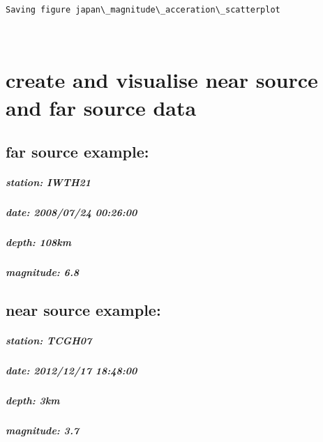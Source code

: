 \documentclass[11pt]{article}
\begin{document}
    \begin{Verbatim}[commandchars=\\\{\}]
Saving figure japan\_magnitude\_acceration\_scatterplot
    \end{Verbatim}

    \begin{center}
    \end{center}
    { \hspace*{\fill} \\}
    
    \hypertarget{create-and-visualise-near-source-and-far-source-data}{%
\section{create and visualise near source and far source
data}\label{create-and-visualise-near-source-and-far-source-data}}

\hypertarget{far-source-example}{%
\subsection{far source example:}\label{far-source-example}}

\hypertarget{station-iwth21}{%
\subparagraph{station: IWTH21}\label{station-iwth21}}

\hypertarget{date-20080724-002600}{%
\subparagraph{date: 2008/07/24 00:26:00}\label{date-20080724-002600}}

\hypertarget{depth-108km}{%
\subparagraph{depth: 108km}\label{depth-108km}}

\hypertarget{magnitude-6.8}{%
\subparagraph{magnitude: 6.8}\label{magnitude-6.8}}

\hypertarget{near-source-example}{%
\subsection{near source example:}\label{near-source-example}}

\hypertarget{station-tcgh07}{%
\subparagraph{station: TCGH07}\label{station-tcgh07}}

\hypertarget{date-20121217-184800}{%
\subparagraph{date: 2012/12/17 18:48:00}\label{date-20121217-184800}}

\hypertarget{depth-3km}{%
\subparagraph{depth: 3km}\label{depth-3km}}

\hypertarget{magnitude-3.7}{%
\subparagraph{magnitude: 3.7}\label{magnitude-3.7}}
\end{document}
